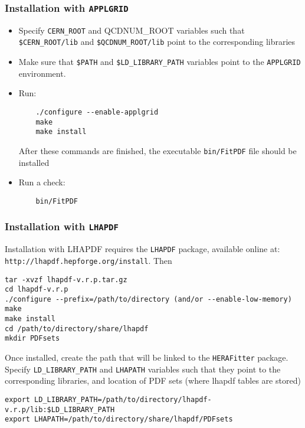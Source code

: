 \subsubsection{Installation with {\tt APPLGRID}}
\begin{itemize}
\item
 Specify {\tt CERN\_ROOT} and {QCDNUM\_ROOT} variables such that\\
     \verb'$CERN_ROOT/lib' and \verb'$QCDNUM_ROOT/lib'
 point to the corresponding libraries
\item Make sure that {\tt \$PATH} and {\tt \$LD\_LIBRARY\_PATH} 
variables point to the {\tt APPLGRID} environment.
\item Run:
\begin{verbatim}
    ./configure --enable-applgrid
    make 
    make install
\end{verbatim}
After these commands are finished, the executable {\tt bin/FitPDF} 
file should be installed
\item  Run a check:
\begin{verbatim}
    bin/FitPDF 
\end{verbatim}
\end{itemize}
\subsubsection{Installation with {\tt LHAPDF}}\label{sec:install_lhapdf}

Installation with LHAPDF requires the {\tt LHAPDF} package, available online at:\\
{\tt http://lhapdf.hepforge.org/install}.
Then
\begin{verbatim}
tar -xvzf lhapdf-v.r.p.tar.gz
cd lhapdf-v.r.p
./configure --prefix=/path/to/directory (and/or --enable-low-memory)
make
make install
cd /path/to/directory/share/lhapdf
mkdir PDFsets
\end{verbatim}

Once installed, create the path that will be linked to the {\tt HERAFitter} package.\\
 Specify \verb'LD_LIBRARY_PATH'
     and {\tt LHAPATH} variables such that they
 point to the corresponding libraries, and location of PDF sets (where lhapdf tables are stored)
\begin{verbatim}
export LD_LIBRARY_PATH=/path/to/directory/lhapdf-v.r.p/lib:$LD_LIBRARY_PATH
export LHAPATH=/path/to/directory/share/lhapdf/PDFsets
\end{verbatim}



